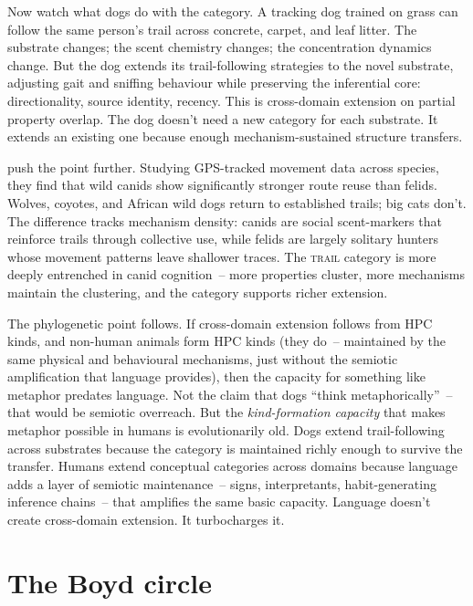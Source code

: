 Now watch what dogs do with the category. A tracking dog trained on grass can follow the same person's trail across concrete, carpet, and leaf litter. The substrate changes; the scent chemistry changes; the concentration dynamics change. But the dog extends its trail-following strategies to the novel substrate, adjusting gait and sniffing behaviour while preserving the inferential core: directionality, source identity, recency. This is cross-domain extension on partial property overlap. The dog doesn't need a new category for each substrate. It extends an existing one because enough mechanism-sustained structure transfers.

\textcite{fagan2025} push the point further. Studying GPS-tracked movement data across species, they find that wild canids show significantly stronger route reuse than felids. Wolves, coyotes, and African wild dogs return to established trails; big cats don't. The difference tracks mechanism density: canids are social scent-markers that reinforce trails through collective use, while felids are largely solitary hunters whose movement patterns leave shallower traces. The \textsc{trail} category is more deeply entrenched in canid cognition~-- more properties cluster, more mechanisms maintain the clustering, and the category supports richer extension.

The phylogenetic point follows. If cross-domain extension follows from HPC kinds, and non-human animals form HPC kinds (they do~-- maintained by the same physical and behavioural mechanisms, just without the semiotic amplification that language provides), then the capacity for something like metaphor predates language. Not the claim that dogs \enquote{think metaphorically}~-- that would be semiotic overreach. But the \emph{kind-formation capacity} that makes metaphor possible in humans is evolutionarily old. Dogs extend trail-following across substrates because the category is maintained richly enough to survive the transfer. Humans extend conceptual categories across domains because language adds a layer of semiotic maintenance~-- signs, interpretants, habit-generating inference chains~-- that amplifies the same basic capacity. Language doesn't create cross-domain extension. It turbocharges it.

\section{The Boyd circle}
\label{sec:16c:boyd-circle}

